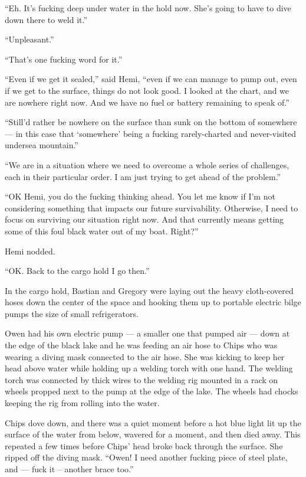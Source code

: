 \documentclass[]{article}
\begin{document}
\begin{multicols}{2}
``Eh. It's fucking deep under water in the hold now. She's going to have
to dive down there to weld it.''

``Unpleasant.''

``That's one fucking word for it.''

``Even if we get it sealed,'' said Hemi, ``even if we can manage to pump
out, even if we get to the surface, things do not look good. I looked at
the chart, and we are nowhere right now. And we have no fuel or battery
remaining to speak of.''

``Still'd rather be nowhere on the surface than sunk on the bottom of
somewhere --- in this case that `somewhere' being a fucking
rarely-charted and never-visited undersea mountain.''

``We are in a situation where we need to overcome a whole series of
challenges, each in their particular order. I am just trying to get
ahead of the problem.''

``OK Hemi, you do the fucking thinking ahead. You let me know if I'm not
considering something that impacts our future survivability. Otherwise,
I need to focus on surviving our situation right now. And that currently
means getting some of this foul black water out of my boat. Right?''

Hemi nodded.

``OK. Back to the cargo hold I go then.''

In the cargo hold, Bastian and Gregory were laying out the heavy
cloth-covered hoses down the center of the space and hooking them up to
portable electric bilge pumps the size of small refrigerators.

Owen had his own electric pump --- a smaller one that pumped air ---
down at the edge of the black lake and he was feeding an air hose to
Chips who was wearing a diving mask connected to the air hose. She was
kicking to keep her head above water while holding up a welding torch
with one hand. The welding torch was connected by thick wires to the
welding rig mounted in a rack on wheels propped next to the pump at the
edge of the lake. The wheels had chocks keeping the rig from rolling
into the water.

Chips dove down, and there was a quiet moment before a hot blue light
lit up the surface of the water from below, wavered for a moment, and
then died away. This repeated a few times before Chips' head broke back
through the surface. She ripped off the diving mask. ``Owen! I need
another fucking piece of steel plate, and --- fuck it -- another brace
too.''


\end{multicols}
\end{document}

